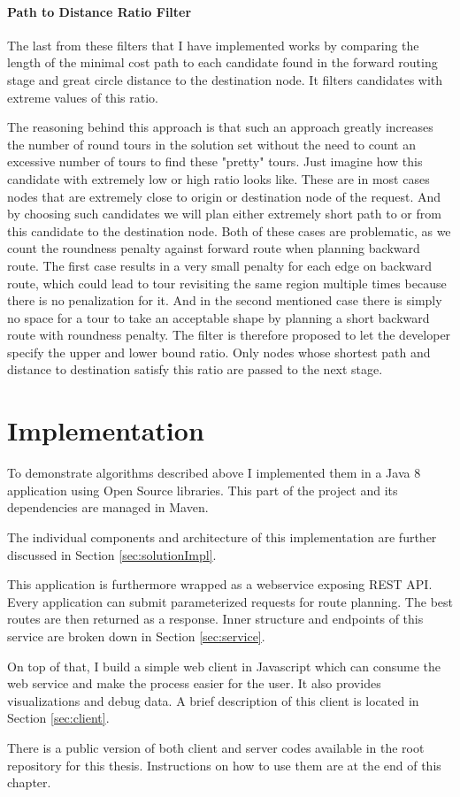 \documentclass{ctuthesis}
\begin{document}
\subsubsection{Path to Distance Ratio Filter}
The last from these filters that I have implemented works by comparing the length of the minimal cost path to each candidate found in the forward routing stage and great circle distance to the destination node. It filters candidates with extreme values of this ratio. \par 
The reasoning behind this approach is that such an approach greatly increases the number of round tours in the solution set without the need to count an excessive number of tours to find these "pretty" tours. Just imagine how this candidate with extremely low or high ratio looks like. These are in most cases nodes that are extremely close to origin or destination node of the request. And by choosing such candidates we will plan either extremely short path to or from this candidate to the destination node. Both of these cases are problematic, as we count the roundness penalty against forward route when planning backward route. The first case results in a very small penalty for each edge on backward route, which could lead to tour revisiting the same region multiple times because there is no penalization for it. And in the second mentioned case there is simply no space for a tour to take an acceptable shape by planning a short backward route with roundness penalty. The filter is therefore proposed to let the developer specify the upper and lower bound ratio. Only nodes whose shortest path and distance to destination satisfy this ratio are passed to the next stage.


\chapter{Implementation}
To demonstrate algorithms described above I implemented them in a Java 8 application using Open Source libraries. This part of the project and its dependencies are managed in Maven. \par The individual components and architecture of this implementation are further discussed in Section \ref{sec:solutionImpl}. \par This application is furthermore wrapped as a webservice exposing REST API.\cite{rest} Every application can submit parameterized requests for route planning. The best routes are then returned as a response. Inner structure and endpoints of this service are broken down in Section \ref{sec:service}. \par On top of that, I build a simple web client in Javascript which can consume the web service and make the process easier for the user. It also provides visualizations and debug data. A brief description of this client is located in Section \ref{sec:client}.\par There is a public version of both client and server codes available in the root repository for this thesis.\cite{git} Instructions on how to use them are at the end of this chapter.
\end{document}
